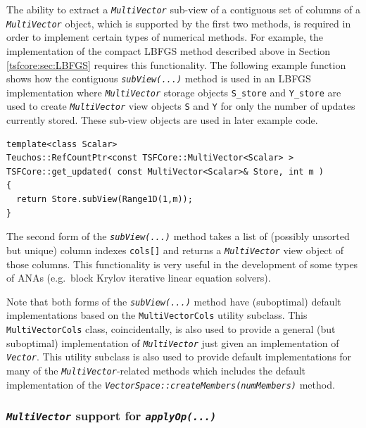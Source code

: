 {}\noindent{}The ability to extract a
{}\texttt{\textit{Multi\-Vector}} sub-view of a contiguous set of
columns of a {}\texttt{\textit{Multi\-Vector}} object, which is
supported by the first two methods, is required in order to implement
certain types of numerical methods.  For example, the implementation
of the compact LBFGS method described above in Section
{}\ref{tsfcore:sec:LBFGS} requires this functionality.  The following
example function shows how the contiguous
{}\texttt{\textit{subView(...)}} method is used in an LBFGS
implementation where {}\texttt{\textit{Multi\-Vector}} storage objects
{}\texttt{S\_store} and {}\texttt{Y\_store} are used to create
{}\texttt{\textit{Multi\-Vector}} view objects {}\texttt{S} and
{}\texttt{Y} for only the number of updates currently stored.  These
sub-view objects are used in later example code.

{\scriptsize\begin{verbatim}
template<class Scalar>
Teuchos::RefCountPtr<const TSFCore::MultiVector<Scalar> >
TSFCore::get_updated( const MultiVector<Scalar>& Store, int m )
{
  return Store.subView(Range1D(1,m));
}
\end{verbatim}}

The second form of the {}\texttt{\textit{subView(...)}} method takes a
list of (possibly unsorted but unique) column indexes
{}\texttt{cols[]} and returns a {}\texttt{\textit{Multi\-Vector}} view
object of those columns.  This functionality is very useful in the
development of some types of ANAs (e.g.~block Krylov iterative linear
equation solvers).

Note that both forms of the {}\texttt{\textit{subView(...)}} method
have (suboptimal) default implementations based on the
{}\texttt{MultiVectorCols} utility subclass.  This
{}\texttt{MultiVectorCols} class, coincidentally, is also used to
provide a general (but suboptimal) implementation of
{}\texttt{\textit{Multi\-Vector}} just given an implementation of
{}\texttt{\textit{Vector}}.  This utility subclass is also used to
provide default implementations for many of the
{}\texttt{\textit{Multi\-Vector}}-related methods which includes the
default implementation of the
{}\texttt{\textit{VectorSpace\-::createMembers(numMembers)}} method.

%
\subsubsection{\texttt{\textit{Multi\-Vector}} support for {}\texttt{\textit{applyOp(\-...)}}}
\label{tsfcore:sec:multi_vec_apply_op}
%

